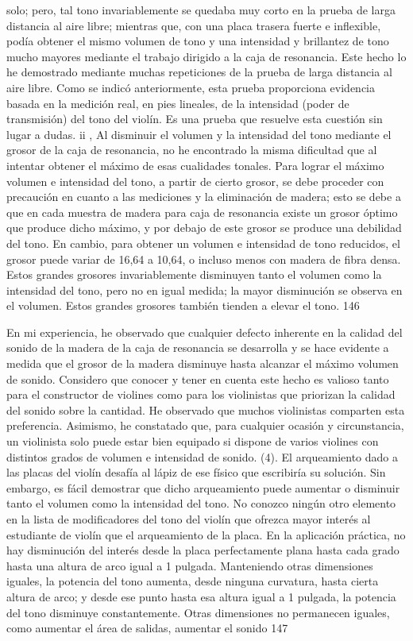 solo; pero, tal tono invariablemente se quedaba muy corto en la prueba de larga distancia al aire libre; mientras que, con una placa trasera fuerte e inflexible, podía obtener el mismo volumen de tono y una intensidad y brillantez de tono mucho mayores mediante el trabajo dirigido a la caja de resonancia. Este hecho lo he demostrado mediante muchas repeticiones de la prueba de larga distancia al aire libre. Como se indicó anteriormente, esta prueba proporciona evidencia basada en la medición real, en pies lineales, de la intensidad (poder de transmisión) del tono del violín. Es una prueba que resuelve esta cuestión sin lugar a dudas. ii ,
Al disminuir el volumen y la intensidad del tono mediante el grosor de la caja de resonancia, no he encontrado la misma dificultad que al intentar obtener el máximo de esas cualidades tonales. Para lograr el máximo volumen e intensidad del tono, a partir de cierto grosor, se debe proceder con precaución en cuanto a las mediciones y la eliminación de madera; esto se debe a que en cada muestra de madera para caja de resonancia existe un grosor óptimo que produce dicho máximo, y por debajo de este grosor se produce una debilidad del tono. En cambio, para obtener un volumen e intensidad de tono reducidos, el grosor puede variar de 16,64 a 10,64, o incluso menos con madera de fibra densa. Estos grandes grosores invariablemente disminuyen tanto el volumen como la intensidad del tono, pero no en igual medida; la mayor disminución se observa en el volumen. Estos grandes grosores también tienden a elevar el tono.
146

En mi experiencia, he observado que cualquier defecto inherente en la calidad del sonido de la madera de la caja de resonancia se desarrolla y se hace evidente a medida que el grosor de la madera disminuye hasta alcanzar el máximo volumen de sonido. Considero que conocer y tener en cuenta este hecho es valioso tanto para el constructor de violines como para los violinistas que priorizan la calidad del sonido sobre la cantidad. He observado que muchos violinistas comparten esta preferencia. Asimismo, he constatado que, para cualquier ocasión y circunstancia, un violinista solo puede estar bien equipado si dispone de varios violines con distintos grados de volumen e intensidad de sonido.
(4). El arqueamiento dado a las placas del violín desafía al lápiz de ese físico que escribiría su solución. Sin embargo, es fácil demostrar que dicho arqueamiento puede aumentar o disminuir tanto el volumen como la intensidad del tono. No conozco ningún otro elemento en la lista de modificadores del tono del violín que ofrezca mayor interés al estudiante de violín que el arqueamiento de la placa. En la aplicación práctica, no hay disminución del interés desde la placa perfectamente plana hasta cada grado hasta una altura de arco igual a 1 pulgada. Manteniendo otras dimensiones iguales, la potencia del tono aumenta, desde ninguna curvatura, hasta cierta altura de arco; y desde ese punto hasta esa altura igual a 1 pulgada, la potencia del tono disminuye constantemente. Otras dimensiones no permanecen iguales, como aumentar el área de salidas, aumentar el sonido
147


